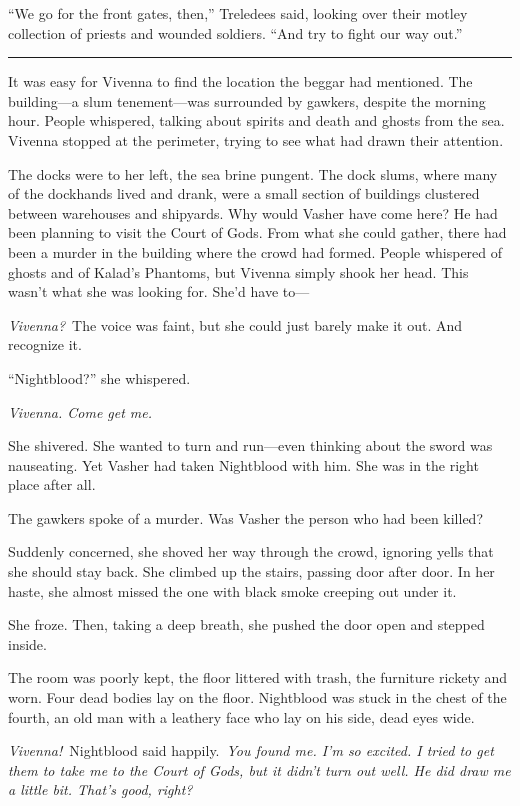 “We go for the front gates, then,” Treledees said, looking over their motley collection of priests and wounded soldiers. “And try to fight our way out.”

\bigskip \hrule \bigskip

It was easy for Vivenna to find the location the beggar had mentioned. The building—a slum tenement—was surrounded by gawkers, despite the morning hour. People whispered, talking about spirits and death and ghosts from the sea. Vivenna stopped at the perimeter, trying to see what had drawn their attention.

The docks were to her left, the sea brine pungent. The dock slums, where many of the dockhands lived and drank, were a small section of buildings clustered between warehouses and shipyards. Why would Vasher have come here? He had been planning to visit the Court of Gods. From what she could gather, there had been a murder in the building where the crowd had formed. People whispered of ghosts and of Kalad’s Phantoms, but Vivenna simply shook her head. This wasn’t what she was looking for. She’d have to—

\textit{Vivenna?}~The voice was faint, but she could just barely make it out. And recognize it.

“Nightblood?” she whispered.

\textit{Vivenna. Come get me.}

She shivered. She wanted to turn and run—even thinking about the sword was nauseating. Yet Vasher had taken Nightblood with him. She was in the right place after all.

The gawkers spoke of a murder. Was Vasher the person who had been killed?

Suddenly concerned, she shoved her way through the crowd, ignoring yells that she should stay back. She climbed up the stairs, passing door after door. In her haste, she almost missed the one with black smoke creeping out under it.

She froze. Then, taking a deep breath, she pushed the door open and stepped inside.

The room was poorly kept, the floor littered with trash, the furniture rickety and worn. Four dead bodies lay on the floor. Nightblood was stuck in the chest of the fourth, an old man with a leathery face who lay on his side, dead eyes wide.

\textit{Vivenna!}~Nightblood said happily.~\textit{You found me. I’m so excited. I tried to get them to take me to the Court of Gods, but it didn’t turn out well. He did draw me a little bit. That’s good, right?}

